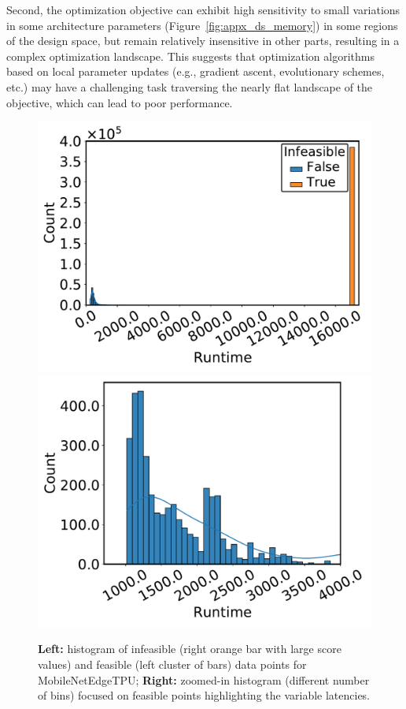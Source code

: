 Second, the optimization objective can exhibit high sensitivity to small variations in some architecture parameters (Figure~\ref{fig:appx_ds_memory}) in some regions of the design space, but remain relatively insensitive in other parts, resulting in a complex optimization landscape. This suggests that optimization algorithms based on local parameter updates (e.g., gradient ascent,  evolutionary schemes, etc.) may have a challenging task traversing the nearly flat landscape of the objective, which can lead to poor performance.
\begin{figure}[t]
    \begin{center}
    \begin{minipage}{\linewidth}
    \centering
    \includegraphics[width=0.35\linewidth]{chapters/prime/figs/dataset/dist.pdf}
    \vspace{-0.1cm}
    \label{fig:ds_dist}
    \centering
    \includegraphics[width=0.35\linewidth]{chapters/prime/figs/dataset/dist_large.pdf}
    \label{fig:ds_dist_large}
    \end{minipage}
    \end{center}
    \vspace{-0.2cm}
    \caption{\footnotesize{\textbf{Left:} histogram of infeasible (right orange bar with large score values) and feasible (left cluster of bars) data points for MobileNetEdgeTPU; \textbf{Right:} zoomed-in histogram (different number of bins) focused on feasible points highlighting the variable latencies.}}
    \vspace{-0.2cm}
    \label{fig:ds_dist_all}
\end{figure}

